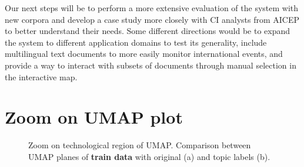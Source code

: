 \documentclass[a4paper]{article}
\begin{document}
Our next steps will be to perform a more extensive evaluation of the system with new corpora and develop a case study more closely with CI analysts from AICEP to better understand their needs. Some different directions would be to expand the system to different application domains to test its generality, include multilingual text documents to more easily monitor international events, and provide a way to interact with subsets of documents through manual selection in the interactive map. 




\appendix
\section{Zoom on UMAP plot}
\begin{figure}[H]
  \centering
  \caption{Zoom on technological region of UMAP. Comparison between UMAP planes of \textbf{train data} with original (a) and topic labels (b).}
  \label{umap_train_plots_zoom}
\end{figure}
\end{document}
